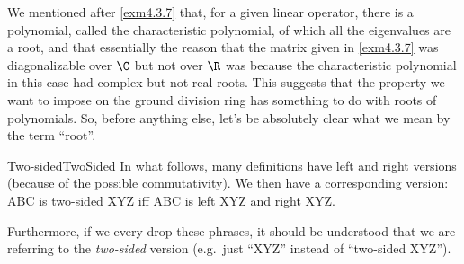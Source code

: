 \horizontalrule

We mentioned after \cref{exm4.3.7} that, for a given linear operator, there is a polynomial, called the characteristic polynomial, of which all the eigenvalues are a root, and that essentially the reason that the matrix given in \cref{exm4.3.7} was diagonalizable over $\C$ but not over $\R$ was because the characteristic polynomial in this case had complex but not real roots.  This suggests that the property we want to impose on the ground division ring has something to do with roots of polynomials.  So, before anything else, let's be absolutely clear what we mean by the term ``root''.
\begin{cnv}{Two-sided}{TwoSided}
	In what follows, many definitions have left and right versions (because of the possible commutativity).  We then have a corresponding  version:  ABC is two-sided XYZ iff ABC is left XYZ and right XYZ.
	
	Furthermore, if we every drop these phrases, it should be understood that we are referring to the \emph{two-sided} version (e.g.~just ``XYZ'' instead of ``two-sided XYZ'').
\end{cnv}

